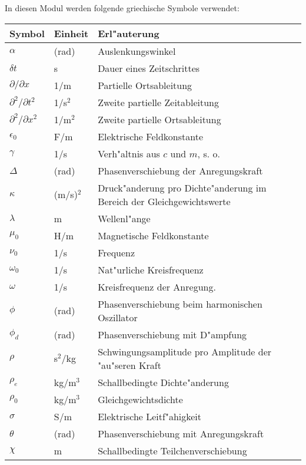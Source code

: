 \begin{MSectionStart}
In diesen Modul werden folgende griechische Symbole verwendet:\\
\begin{tabular}{|l|l|l|}
\hline
  Symbol & Einheit & Erl"auterung \\\hline
  $\alpha$      & (rad)   & Auslenkungswinkel \\\hline
  $\delta t$    & s       & Dauer eines Zeitschrittes \\\hline
  $\partial / \partial x$ & 1/m & Partielle Ortsableitung \\\hline
  $\partial^2 / \partial t^2$ & 1/s$^2$ & Zweite partielle Zeitableitung \\\hline
  $\partial^2 / \partial x^2$ & 1/m$^2$ & Zweite partielle Ortsableitung \\\hline
  $\epsilon_0$  & F/m     & Elektrische Feldkonstante \\\hline
  $\gamma$      & 1/s     & Verh"altnis aus $c$ und $m$, s. o. \\\hline
  $\Delta$	& (rad)   & Phasenverschiebung der Anregungskraft \\\hline
  $\kappa$      & (m/s)$^2$    & Druck"anderung pro Dichte"anderung im Bereich der Gleichgewichtswerte \\\hline
  $\lambda$     & m       & Wellenl"ange \\\hline
  $\mu_0 $      & H/m     & Magnetische Feldkonstante \\\hline
  $\nu_0$       & 1/s     & Frequenz \\\hline
  $\omega_0$    & 1/s     & Nat"urliche Kreisfrequenz \\\hline
  $\omega$      & 1/s     & Kreisfrequenz der Anregung. \\\hline
  $\phi$	& (rad)	  & Phasenverschiebung beim harmonischen Oszillator \\\hline
  $\phi_d$	& (rad)   & Phasenverschiebung mit D"ampfung \\\hline
  $\rho$        & s$^2$/kg& Schwingungsamplitude pro Amplitude der "au"seren Kraft \\\hline
  $\rho_e$      & kg/m$^3$ & Schallbedingte Dichte"anderung \\\hline
  $\rho_0$      & kg/m$^3$ & Gleichgewichtsdichte \\\hline
  $\sigma$      & S/m     & Elektrische Leitf"ahigkeit \\   \hline
  $\theta$      & (rad)   & Phasenverschiebung mit Anregungskraft \\\hline
  $\chi$        & m       & Schallbedingte Teilchenverschiebung\\\hline
\end{tabular}

\end{MSectionStart}


